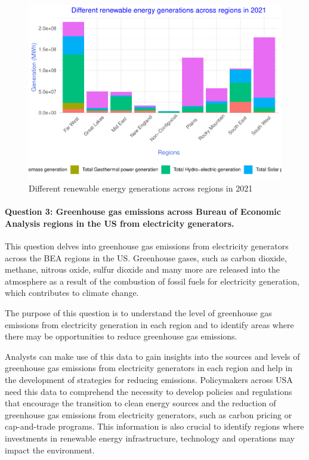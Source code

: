 \documentclass[
]{article}
\begin{document}
\begin{figure}

{\centering \includegraphics{EDA_Project_Mutha_Kry_Ghosh_VS_files/figure-latex/Q2plot-1} 

}

\caption{Different renewable energy generations across regions in 2021}\label{fig:Q2plot}
\end{figure}

\hypertarget{question-3-greenhouse-gas-emissions-across-bureau-of-economic-analysis-regions-in-the-us-from-electricity-generators.}{%
\paragraph{Question 3: Greenhouse gas emissions across Bureau of
Economic Analysis regions in the US from electricity
generators.}\label{question-3-greenhouse-gas-emissions-across-bureau-of-economic-analysis-regions-in-the-us-from-electricity-generators.}}

This question delves into greenhouse gas emissions from electricity
generators across the BEA regions in the US. Greenhouse gases, such as
carbon dioxide, methane, nitrous oxide, sulfur dioxide and many more are
released into the atmosphere as a result of the combustion of fossil
fuels for electricity generation, which contributes to climate change.

The purpose of this question is to understand the level of greenhouse
gas emissions from electricity generation in each region and to identify
areas where there may be opportunities to reduce greenhouse gas
emissions.

Analysts can make use of this data to gain insights into the sources and
levels of greenhouse gas emissions from electricity generators in each
region and help in the development of strategies for reducing emissions.
Policymakers across USA need this data to comprehend the necessity to
develop policies and regulations that encourage the transition to clean
energy sources and the reduction of greenhouse gas emissions from
electricity generators, such as carbon pricing or cap-and-trade
programs. This information is also crucial to identify regions where
investments in renewable energy infrastructure, technology and
operations may impact the environment.
\end{document}
